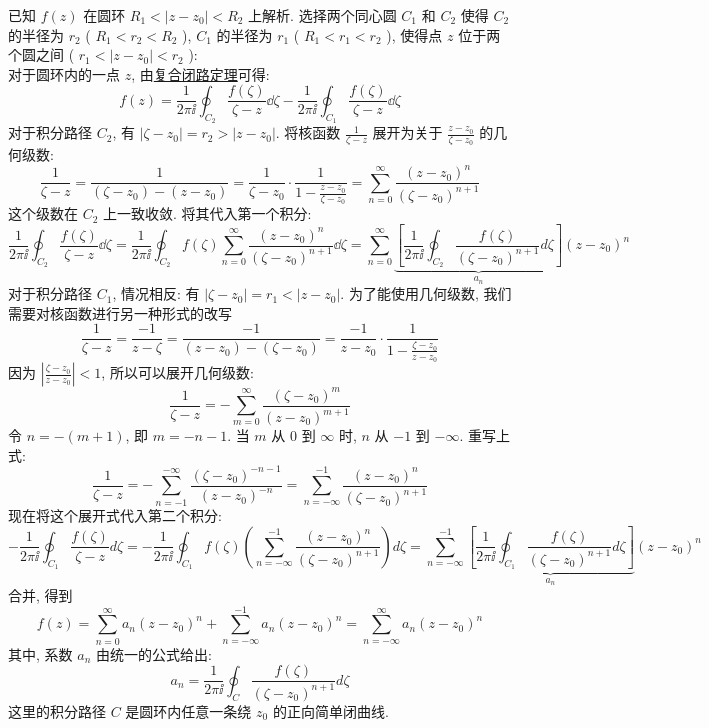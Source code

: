 \documentclass[UTF8]{ctexart}
\begin{document}
\begin{prf}
    已知  \( f(z) \)  在圆环  \( R_1 < |z - z_0| < R_2 \)  上解析. 选择两个同心圆  \( C_1 \)  和  \( C_2 \)  使得  \( C_2 \)  的半径为  \( r_2 \)  ( \( R_1 < r_2 < R_2 \) ),  \( C_1 \)  的半径为  \( r_1 \)  ( \( R_1 < r_1 < r_2 \) ), 使得点  \( z \)  位于两个圆之间 ( \( r_1 < |z - z_0| < r_2 \) ):\\
    对于圆环内的一点  \( z \), 由\hyperref[thm:CombinedClosedCircuit]{复合闭路定理}可得: 
    \[f(z) = \frac{1}{2\pi\ii} \oint_{C_2} \frac{f(\zeta)}{\zeta - z} \dd\zeta - \frac{1}{2\pi\ii} \oint_{C_1} \frac{f(\zeta)}{\zeta - z}  \dd\zeta\]
    对于积分路径  \( C_2 \), 有  \( |\zeta - z_0| = r_2 > |z - z_0| \). 将核函数  \( \frac{1}{\zeta - z} \)  展开为关于  \( \frac{z-z_0}{\zeta-z_0} \)  的几何级数: 
    \[\frac{1}{\zeta - z} = \frac{1}{(\zeta - z_0) - (z - z_0)} = \frac{1}{\zeta - z_0} \cdot \frac{1}{1 - \frac{z-z_0}{\zeta-z_0}} = \sum_{n=0}^{\infty} \frac{(z - z_0)^n}{(\zeta - z_0)^{n+1}}\]
    这个级数在  \( C_2 \)  上一致收敛. 将其代入第一个积分: 
    \[\frac{1}{2\pi\ii} \oint_{C_2} \frac{f(\zeta)}{\zeta - z} \dd\zeta = \frac{1}{2\pi\ii} \oint_{C_2} f(\zeta) \sum_{n=0}^{\infty} \frac{(z - z_0)^n}{(\zeta - z_0)^{n+1}} \dd\zeta = \sum_{n=0}^{\infty} \underbrace{\left[ \frac{1}{2\pi\ii} \oint_{C_2} \frac{f(\zeta)}{(\zeta - z_0)^{n+1}} d\zeta \right]}_{a_n} (z - z_0)^n\]
    对于积分路径  \( C_1 \), 情况相反: 有  \( |\zeta - z_0| = r_1 < |z - z_0| \). 为了能使用几何级数, 我们需要对核函数进行另一种形式的改写
    \[\frac{1}{\zeta - z} = \frac{-1}{z - \zeta} = \frac{-1}{(z - z_0) - (\zeta - z_0)} = \frac{-1}{z - z_0} \cdot \frac{1}{1 - \frac{\zeta-z_0}{z-z_0}}\]
    因为  \( \left| \frac{\zeta-z_0}{z-z_0} \right| < 1 \), 所以可以展开几何级数: 
    \[\frac{1}{\zeta - z} = -\sum_{m=0}^{\infty} \frac{(\zeta - z_0)^m}{(z - z_0)^{m+1}}\]
    令  \( n = -(m+1) \), 即  \( m = -n - 1 \). 当  \( m \)  从  \( 0 \)  到  \( \infty \)  时,  \( n \)  从  \( -1 \)  到  \( -\infty \). 重写上式: 
    \[\frac{1}{\zeta - z} = -\sum_{n=-1}^{-\infty} \frac{(\zeta - z_0)^{-n-1}}{(z - z_0)^{-n}} = \sum_{n=-\infty}^{-1} \frac{(z - z_0)^n}{(\zeta - z_0)^{n+1}}\]
    现在将这个展开式代入第二个积分: 
    \[-\frac{1}{2\pi\ii} \oint_{C_1} \frac{f(\zeta)}{\zeta - z}  d\zeta = -\frac{1}{2\pi\ii} \oint_{C_1} f(\zeta) \left( \sum_{n=-\infty}^{-1} \frac{(z - z_0)^n}{(\zeta - z_0)^{n+1}} \right) d\zeta = \sum_{n=-\infty}^{-1} \underbrace{\left[ \frac{1}{2\pi\ii} \oint_{C_1} \frac{f(\zeta)}{(\zeta - z_0)^{n+1}} d\zeta \right]}_{a_n} (z - z_0)^n\]
    合并, 得到
    \[f(z) = \sum_{n=0}^{\infty} a_n (z - z_0)^n + \sum_{n=-\infty}^{-1} a_n (z - z_0)^n = \sum_{n=-\infty}^{\infty} a_n (z - z_0)^n\]
    其中, 系数  \( a_n \)  由统一的公式给出: 
    \[a_n = \frac{1}{2\pi\ii} \oint_C \frac{f(\zeta)}{(\zeta - z_0)^{n+1}}  d\zeta\]
    这里的积分路径  \( C \)  是圆环内任意一条绕  \( z_0 \)  的正向简单闭曲线. 
\end{prf}
\end{document}
